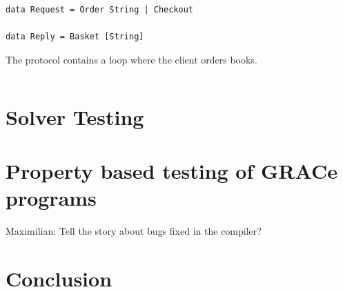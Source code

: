 \documentclass{article}
\begin{document}
\begin{verbatim}
data Request = Order String | Checkout

data Reply = Basket [String]
\end{verbatim}

The protocol contains a loop where the client orders books.

\begin{verbatim}

\end{verbatim}


\section{Solver Testing}



\section{Property based testing of GRACe programs}

Maximilian: Tell the story about bugs fixed in the compiler?



\section{Conclusion}
\end{document}
